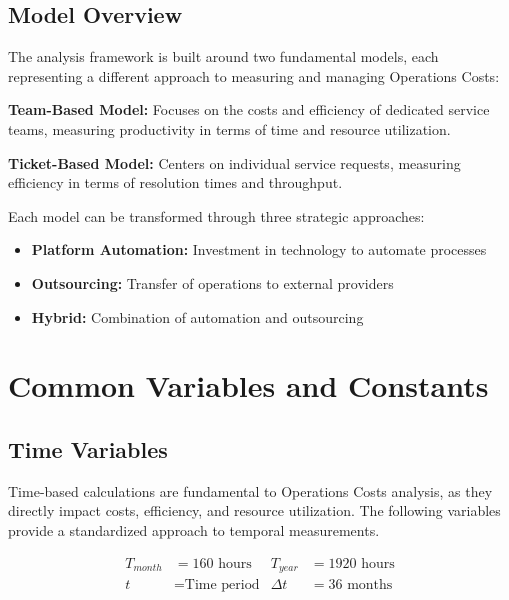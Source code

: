 \documentclass[12pt,a4paper]{article}
\newenvironment{definition}[1]
{\begin{mdframed}[style=definitionstyle,frametitle={Definition: #1}]}
{\end{mdframed}}
\newenvironment{explanation}
{\begin{mdframed}[style=explanationstyle,frametitle={Explanation}]}
{\end{mdframed}}
\begin{document}
\subsection{Model Overview}

\begin{explanation}
The analysis framework is built around two fundamental models, each representing a different approach to measuring and managing Operations Costs:

\textbf{Team-Based Model:} Focuses on the costs and efficiency of dedicated service teams, measuring productivity in terms of time and resource utilization.

\textbf{Ticket-Based Model:} Centers on individual service requests, measuring efficiency in terms of resolution times and throughput.

Each model can be transformed through three strategic approaches:
\begin{itemize}
    \item \textbf{Platform Automation:} Investment in technology to automate processes
    \item \textbf{Outsourcing:} Transfer of operations to external providers
    \item \textbf{Hybrid:} Combination of automation and outsourcing
\end{itemize}
\end{explanation}

\section{Common Variables and Constants}
\subsection{Time Variables}

Time-based calculations are fundamental to Operations Costs analysis, as they directly impact costs, efficiency, and resource utilization. The following variables provide a standardized approach to temporal measurements.

\begin{definition}{Time Parameters}
\begin{align*}
    T_{month} &= 160 \text{ hours} & T_{year} &= 1920 \text{ hours} \\
    t &= \text{Time period} & \Delta t &= 36 \text{ months}
\end{align*}
\end{definition}
\end{document}
